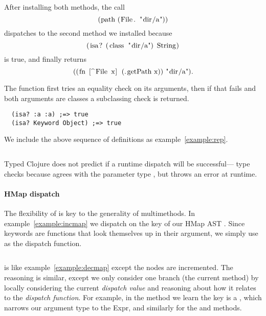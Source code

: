 After installing both methods, the call 
$$
\clj{(path (File. "dir/a"))}
$$
dispatches to the second method we installed because
$$
\clj{(isa? (class "dir/a") String)}
$$
is true, and finally returns 
$$
\clj{((fn [^File x] (.getPath x)) "dir/a")}.
$$

The  function first tries an equality check
on its arguments, then if that fails
and both arguments are classes a subclassing
check is returned.
\begin{verbatim}
  (isa? :a :a) ;=> true
  (isa? Keyword Object) ;=> true
\end{verbatim}

We include the above sequence of definitions as example~\ref{example:rep}.

\begin{Code}
\begin{exmp}
\inputminted[firstline=5,lastline=10]{clojure}{code/demo/src/demo/rep.clj}
\label{example:rep}
\end{exmp}
\end{Code}

Typed Clojure does not predict if a runtime dispatch will be successful--- 
type checks because  agrees with the parameter type ,
but throws an error at runtime.

\paragraph{HMap dispatch} The flexibility of  is key to the generality of multimethods. 
In example~\ref{example:incmap} we
dispatch on the  key 
of our HMap AST .
Since keywords are functions that look themselves up in their argument, we simply
use  as the dispatch function.

\begin{exmp}
\inputminted[firstline=5,lastline=18]{clojure}{code/demo/src/demo/eg5.clj}
\label{example:incmap}
\end{exmp}

 is like example~\ref{example:decmap} except the nodes are incremented.
The reasoning is similar, except we only consider one branch (the current method) by
locally considering the current \emph{dispatch value} and reasoning about how it relates
to the \emph{dispatch function}.
For example, 
in the  method we learn the  key is a , which
narrows our argument type to the  Expr, and similarly for the 
and  methods.

